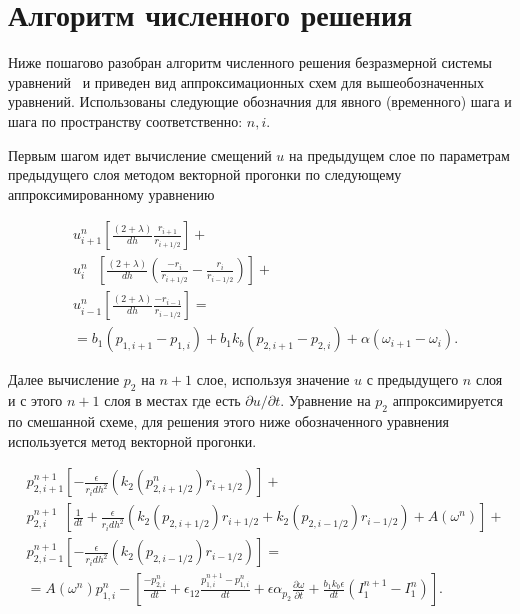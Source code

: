 \section{Алгоритм численного решения}\label{sec:ch3/sect3}

Ниже пошагово разобран алгоритм численного решения безразмерной системы уравнений~ и приведен вид аппроксимационных схем для вышеобозначенных уравнений. Использованы следующие обозначния для явного (временного) шага и шага по пространству соответственно: $n, i$.

Первым шагом идет вычисление смещений $u$ на предыдущем слое по параметрам предыдущего слоя методом векторной прогонки по следующему аппроксимированному уравнению

\begin{equation}
\label{eq:approxu}
\begin{alignedat}{2}
&u_{i+1}^n \left[ \frac{(2+\lambda)}{dh} \frac{r_{i+1}}{r_{i+1/2}} \right] +   \\
&u_i^n \:\:\:\left[ \frac{(2+\lambda)}{dh} \left( \frac{-r_i}{r_{i+1/2}} - \frac{r_i}{r_{i-1/2}}\right) \right] +  \\
&u_{i-1}^n \left[\frac{(2+\lambda)}{dh} \frac{- r_{i-1}}{r_{i-1/2}}  \right] = \\
&=b_1 (p_{1, i+1} - p_{1, i}) + b_1 k_b (p_{2, i+1} - p_{2, i}) + \alpha (\omega_{i+1} - \omega_i).
\end{alignedat}
\end{equation}

Далее вычисление $p_2$ на $n+1$ слое, используя значение $u$ с предыдущего $n$ слоя и с этого $n+1$ слоя в местах где есть $\partial u / \partial t$. Уравнение на $p_2$ аппроксимируется по смешанной схеме, для решения этого ниже обозначенного уравнения используется метод векторной прогонки.

\begin{equation}
\label{eq:approxp2}
\begin{alignedat}{2}
&p_{2, i+1}^{n+1} \left[ -\frac{\epsilon}{r_i dh^2} (k_2(p_{2, i+1/2}^n) r_{i+1/2})\right] + \\
&p_{2, i}^{n+1} \:\: \left[ \frac{1}{dt} + \frac{\epsilon}{r_i dh^2} (k_2(p_{2, i+1/2}) r_{i+1/2} + k_2(p_{2, i -1/2}) r_{i-1/2}) + A(\omega^n) \right] + \\
&p_{2, i-1}^{n+1} \left[ - \frac{\epsilon}{r_i dh^2} (k_2(p_{2, i-1/2}) r_{i-1/2}) \right] = \\
&=A(\omega^n) p_{1, i}^n - \left[ \frac{-p_{2, i}^n}{dt} + \epsilon_{12} \frac{p_{1, i}^{n+1} - p_{1,i}^n}{dt} + \epsilon \alpha_{p_2} \frac{\partial \omega}{\partial t} + \frac{b_1 k_b \epsilon}{dt} (I_1^{n+1} - I_1^n) \right].
\end{alignedat}
\end{equation}

